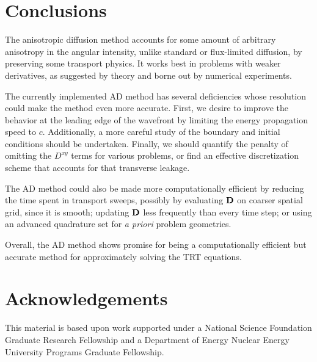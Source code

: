 \documentclass[11pt,letter,twoside]{mc2011}
\newcommand{\Dtens}{\mat{D}}
\begin{document}
\clearpage
\section{Conclusions}
The anisotropic diffusion method accounts for some amount of arbitrary
anisotropy in the angular intensity, unlike standard or flux-limited diffusion,
by preserving some transport physics. It works best in problems with weaker
derivatives, as suggested by theory and borne out by numerical experiments.

The currently implemented AD method has several deficiencies whose resolution
could make the method even more accurate. First, we desire to improve the
behavior at the leading edge of the wavefront by limiting the energy
propagation speed to $c$. Additionally, a more careful study of the boundary
and initial conditions should be undertaken. Finally, we should quantify the
penalty of omitting the $D^{xy}$ terms for various problems, or find an
effective discretization scheme that accounts for that transverse leakage.

The AD method could also be made
more computationally efficient by reducing the time spent in transport sweeps,
possibly by
evaluating $\Dtens$ on coarser spatial grid, since it is smooth;
updating $\Dtens$ less frequently than every time step; or
using an advanced quadrature set for \emph{a priori} problem geometries.

Overall, the AD method shows promise for being a computationally efficient
but accurate method for approximately solving the TRT equations.

\section*{Acknowledgements}
This material is based upon work supported under a National Science Foundation
Graduate Research Fellowship and a Department of Energy Nuclear
Energy University Programs Graduate Fellowship.




\end{document}
